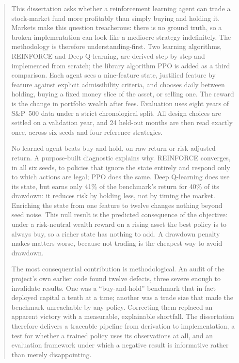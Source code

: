 \documentclass[11pt,a4paper]{report}
\begin{document}
\begin{abstract}
This dissertation asks whether a reinforcement learning agent can trade a
stock-market fund more profitably than simply buying and holding it.
Markets make this question treacherous: there is no ground truth, so a
broken implementation can look like a mediocre strategy indefinitely. The
methodology is therefore understanding-first. Two learning algorithms,
REINFORCE and Deep Q-learning, are derived step by step and implemented
from scratch; the library algorithm PPO is added as a third comparison.
Each agent sees a nine-feature state, justified feature by feature against
explicit admissibility criteria, and chooses daily between holding, buying
a fixed money slice of the asset, or selling one. The reward is the change
in portfolio wealth after fees. Evaluation uses eight years of S\&P~500
data under a strict chronological split. All design choices are settled on
a validation year, and 24 held-out months are then read exactly once,
across six seeds and four reference strategies.

No learned agent beats buy-and-hold, on raw return or risk-adjusted
return. A purpose-built diagnostic explains why. REINFORCE converges, in
all six seeds, to policies that ignore the state entirely and respond only
to which actions are legal; PPO does the same. Deep Q-learning does use
its state, but earns only 41\% of the benchmark's return for 40\% of its
drawdown: it reduces risk by holding less, not by timing the market.
Enriching the state from one feature to twelve changes nothing beyond seed
noise. This null result is the predicted consequence of the objective:
under a risk-neutral wealth reward on a rising asset the best policy is to
always buy, so a richer state has nothing to add. A drawdown penalty makes
matters worse, because not trading is the cheapest way to avoid drawdown.

The most consequential contribution is methodological. An audit of the
project's own earlier code found twelve defects, three severe enough to
invalidate results. One was a ``buy-and-hold'' benchmark that in fact
deployed capital a tenth at a time; another was a trade size that made the
benchmark unreachable by any policy. Correcting them replaced an apparent
victory with a measurable, explainable shortfall. The dissertation
therefore delivers a traceable pipeline from derivation to implementation,
a test for whether a trained policy uses its observations at all, and an
evaluation framework under which a negative result is informative rather
than merely disappointing.
\end{abstract}

\tableofcontents
\listoffigures
\listoftables








\appendix






\end{document}

